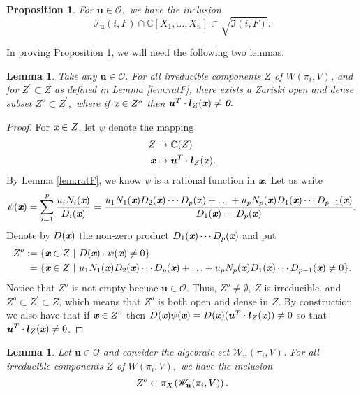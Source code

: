 \documentclass[a4paper]{article}
\def\sO{\mathscr{O}}
\def\bz{\textit{\textbf{0}}}
\def\Xb{\textit{\textbf{X}}}
\def\ub{{\bm u}}
\def\lb{{\bm l}}
\def\xb{\textit{\textbf{x}}}
\def\C{\mathbb{C}}
\def\Wi{W(\pi_i,V)}
\def\Iir{\sqrt{\mathfrak{I}(i,F)}}
\def\Iil{\mathscr{I}_{\ub}(i,F)}
\def\Wil{\mathscr{W}_{\ub}(\pi_i,V)}
\newtheorem{lemma}[theorem]{Lemma}
\newtheorem{prop}[theorem]{Proposition}
\begin{document}
\begin{prop}\label{prop:polarVs1}
For $\ub \in \mathscr{O},$ we have the inclusion 
\[
\Iil \cap \C[X_1,\hdots,X_n] \subset \Iir.
\]
\end{prop}
%
%
\noindent 
In proving Proposition \ref{prop:polarVs1}, we will need the following two lemmas.
\begin{lemma}\label{lem:3.8}
Take any $\ub \in \mathscr{O}.$ For all irreducible components $Z$ of $\Wi$, and for $Z^{'} \subset Z$ as defined in Lemma \ref{lem:ratF}, there exists a Zariski open and dense subset $Z^o \subset Z^{'},$ where if  $\xb \in Z^o$ then $\ub^T\cdot \lb_{Z}(\xb) \not = \bz.$ 
\end{lemma}
%
\begin{proof}
For $\xb \in Z$, let $\psi$ denote the mapping 
\begin{align*}
Z  &\rightarrow \C(Z)\\    
    \xb &\mapsto \ub^T \cdot \lb_{Z}(\xb).    
\end{align*}
 By Lemma \ref{lem:ratF}, we know $\psi$ is a rational function in $\xb.$ Let us write 
\[
\psi(\xb) = \sum_{i=1}^p\frac{u_iN_{i}(\xb)}{D_{i}(\xb)}
= \frac{u_1N_1(\xb)D_2(\xb)\cdots D_p(\xb) + \hdots + u_pN_p(\xb)D_1(\xb)\cdots D_{p-1}(\xb)}{D_1(\xb) \cdots D_p(\xb)}
. 
\]
Denote by $D(\xb)$ the non-zero product $D_1(\xb) \cdots D_p(\xb)$ and put  
\begin{align*}
Z^o := \{\xb \in Z~&|~D(\xb)\cdot \psi(\xb) \not = 0\} \\
= \{\xb \in Z~&|~u_1N_1(\xb)D_2(\xb)\cdots D_p(\xb) + \hdots + u_pN_p(\xb)D_1(\xb)\cdots D_{p-1}(\xb) \not = 0\}.
\end{align*}
Notice that $Z^{o}$ is not empty becuae $\ub \in \sO.$ Thus, $Z^o \not = \emptyset$, $Z$ is irreducible, and $Z^o \subset Z^{'} \subset Z$, which means that $Z^o$ is both open and dense in $Z$.  By construction we also have that if $\xb \in Z^o$ then $D({\xb})\psi(\xb) = D({\xb})(\ub^T \cdot \lb_Z(\xb))\not = 0$ so that $\ub^T \cdot \lb_{Z}(\xb)\not = 0$.
\end{proof}
%
\begin{lemma}\label{lem:3.9}
Let $\ub \in \mathscr{O}$ and consider the algebraic set $\Wil$. For all irreducible components $Z$ of $\Wi,$ we have the inclusion \[Z^o \subset \pi_{\Xb}\left(\Wil\right).\]
\end{lemma}
\end{document}
